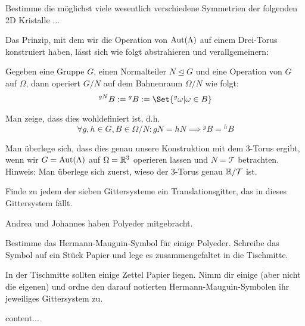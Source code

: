 \begin{sheet}

\begin{problem}
Bestimme die möglichst viele wesentlich verschiedene Symmetrien der folgenden 2D Kristalle ...
\end{problem}

\begin{problem}[difficulty={fortgeschritten}]
Das Prinzip, mit dem wir die Operation von $\operatorname{Aut}(\Lambda)$ auf einem Drei-Torus konstruiert haben, lässt sich wie folgt abstrahieren und verallgemeinern:

Gegeben eine Gruppe $G$, einen Normalteiler $N\unlhd G$ und eine Operation von $G$ auf $\Omega$, dann operiert $G/N$ auf dem Bahnenraum $\Omega/N$ wie folgt:
\[{^{gN} B} := {^g B} := \Set{{^g \omega} | \omega\in B}\]
\begin{subproblem}[difficulty={einfach}]
Man zeige, dass dies wohldefiniert ist, d.h.
\[\forall g,h\in G, B\in\Omega/N: gN=hN \implies {^g B} = {^h B}\]
\end{subproblem}
\begin{subproblem}[difficulty={mittel}]
Man überlege sich, dass dies genau unsere Konstruktion mit dem 3-Torus ergibt, wenn wir $G=\operatorname{Aut}(\Lambda)$ auf $\Omega=\mathbb{R}^3$ operieren lassen und $N=\mathcal{T}$ betrachten. Hinweis: Man überlege sich zuerst, wieso der 3-Torus genau $\mathbb{R} / \mathcal{T}$ ist.
\end{subproblem}
\end{problem}

\begin{problem}[difficulty={leicht bis mittel}]
Finde zu jedem der sieben Gittersysteme ein Translationsgitter, das in dieses Gittersystem fällt.
\end{problem}

\begin{problem}
	Andrea und Johannes haben Polyeder mitgebracht. 
	\begin{subproblem}
		Bestimme das Hermann-Mauguin-Symbol für einige Polyeder. Schreibe das Symbol auf ein Stück Papier und lege es zusammengefaltet in die Tischmitte.
	\end{subproblem}
	\begin{subproblem}
		In der Tischmitte sollten einige Zettel Papier liegen. Nimm dir einige (aber nicht die eigenen) und ordne den darauf notierten Hermann-Mauguin-Symbolen ihr jeweiliges Gittersystem zu.
	\end{subproblem}
	
\end{problem}
\begin{problem}
	content...
\end{problem}


\end{sheet}